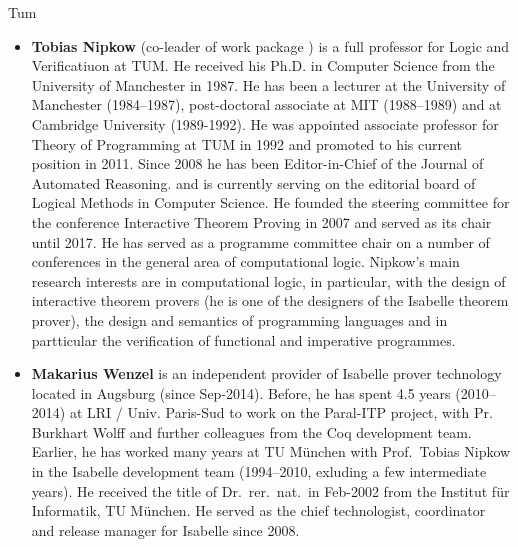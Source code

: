 \begin{sitedescription}{Tum}
\begin{itemize}
\item \textbf{Tobias Nipkow} (co-leader of work package
  ) is a full professor for Logic and
  Verificatiuon at TUM. He received his Ph.D. in Computer Science
  from the University of Manchester in 1987.  He has been a
  lecturer at the University of Manchester (1984--1987),
  post-doctoral associate at MIT (1988--1989) and at Cambridge
  University (1989-1992). He was appointed associate professor for Theory of Programming at
  TUM in 1992 and promoted to his current position in 2011. Since 2008
  he has been Editor-in-Chief of the  Journal of Automated Reasoning.
 and is currently serving on the editorial board of Logical Methods in
 Computer Science. He founded the steering committee for the
 conference Interactive Theorem Proving in 2007 and served as its
 chair until 2017.
 He has served as a programme committee chair
on a number of conferences in the general area of computational logic.  Nipkow's main research
interests are in computational logic, in particular, with the design of
interactive theorem provers (he is one of the designers of the
Isabelle theorem prover), the design and semantics of programming
languages and in partticular the verification of functional and
imperative programmes.

\item \textbf{Makarius Wenzel} is an independent provider of Isabelle
  prover technology located in Augsburg (since Sep-2014). Before, he
  has spent 4.5 years (2010--2014) at LRI / Univ. Paris-Sud to work on
  the Paral-ITP project, with Pr. Burkhart Wolff and further
  colleagues from the Coq development team. Earlier, he has worked
  many years at TU München with Prof.\ Tobias Nipkow in the Isabelle
  development team (1994--2010, exluding a few intermediate years). He
  received the title of Dr.~rer.~nat.\ in Feb-2002 from the Institut
  für Informatik, TU München. He served as the chief technologist,
  coordinator and release manager for Isabelle since 2008.

\end{itemize}

\end{sitedescription}

